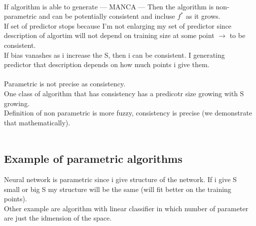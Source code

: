 \documentclass[../main.tex]{subfiles}
\begin{document}
\\
If algorithm is able to generate 
--- MANCA ---
Then the algorithm is non-parametric and can be potentially consistent and incluse $f^*$ as it grows.
\\
If set of predictor stops because I'm not enlarging my set of predictor since description of algortim will not depend on training size at some point \qquad $\rightarrow$ to be consistent.
\\
If bias vanashes as i increase the S, then i can be consistent. I generating predictor that description depends on how much points i give them.
\\\\
Parametric is not precise as consistency. 
\\
One class of algorithm that has consistency has a predicotr size growing with S growing.
\\
Definition of non parametric is more fuzzy, consistency is precise (we demonstrate that mathematically).
\\\\

\subsection{Example of parametric algorithms}
Neural network is parametric since i give structure of the network.
If i give S small or big S my structure will be the same (will fit better on the training points).
\\
Other example are algorithm with linear classifier in which number of parameter are just the idmension of the space.
\end{document}
